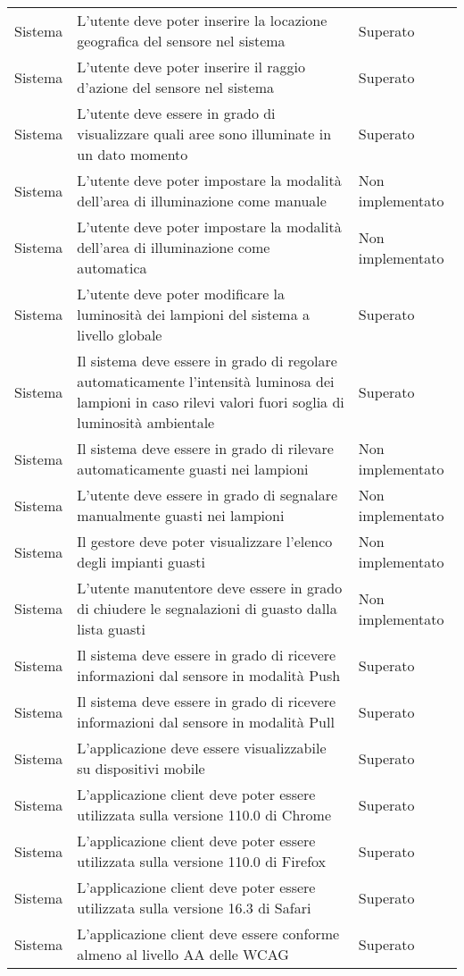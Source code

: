 \begin{center}
\begin{xltabular}{\linewidth}{|l|X|l|}
        Sistema & L'utente deve poter inserire la locazione geografica del sensore nel sistema & Superato\\
        Sistema & L'utente deve poter inserire il raggio d'azione del sensore nel sistema & Superato\\
        Sistema & L'utente deve essere in grado di visualizzare quali aree sono illuminate in un dato momento & Superato\\
        Sistema & L'utente deve poter impostare la modalità dell'area di illuminazione come manuale & Non implementato\\
        Sistema & L'utente deve poter impostare la modalità dell'area di illuminazione come automatica & Non implementato\\
        Sistema & L'utente deve poter modificare la luminosità dei lampioni del sistema a livello globale & Superato\\
        Sistema & Il sistema deve essere in grado di regolare automaticamente l'intensità luminosa dei lampioni in caso rilevi valori fuori soglia di luminosità ambientale & Superato\\
        Sistema & Il sistema deve essere in grado di rilevare automaticamente guasti nei lampioni & Non implementato\\
        Sistema & L'utente deve essere in grado di segnalare manualmente guasti nei lampioni & Non implementato\\
        Sistema & Il gestore deve poter visualizzare l'elenco degli impianti guasti & Non implementato\\
        Sistema & L'utente manutentore deve essere in grado di chiudere le segnalazioni di guasto dalla lista guasti & Non implementato\\
        Sistema & Il sistema deve essere in grado di ricevere informazioni dal sensore in modalità Push & Superato\\
        Sistema & Il sistema deve essere in grado di ricevere informazioni dal sensore in modalità Pull & Superato\\
        Sistema & L'applicazione deve essere visualizzabile su dispositivi mobile & Superato\\
        Sistema & L'applicazione client deve poter essere utilizzata sulla versione 110.0 di Chrome  & Superato\\
        Sistema & L'applicazione client deve poter essere utilizzata sulla versione 110.0 di Firefox  & Superato\\
        Sistema & L'applicazione client deve poter essere utilizzata sulla versione 16.3 di Safari  & Superato\\
        Sistema & L'applicazione client deve essere conforme almeno al livello AA delle WCAG  & Superato\\
    
        
        \hline
    \end{xltabular}
\end{center}

